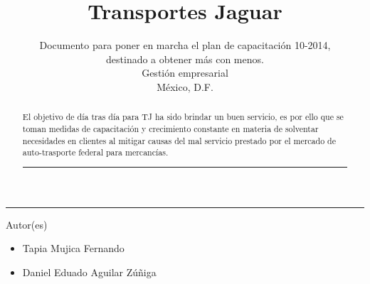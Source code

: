\title{Transportes Jaguar}
\author{Documento para poner en marcha el plan de capacitación 10-2014, \\destinado a obtener más con menos.\\
\small Gestión empresarial\\
\small México, D.F.
}

\vspace{2cm}
\maketitle		
	\vspace*{-1cm}
	\begin{center}\rule{0.9\textwidth}{0.1mm}\end{center}
	\begin{abstract}
	\normalsize El objetivo de día tras día para TJ ha sido brindar un buen servicio, es por ello que se toman medidas de capacitación y crecimiento constante en materia de solventar necesidades en clientes al mitigar causas del mal servicio prestado por el mercado de auto-trasporte federal para mercancías.
	\begin{center}\rule{0.9\textwidth}{0.1mm}\end{center}
	\vspace*{0.5cm}
	\end{abstract}
	\vspace*{9cm}
\small Autor(es)
\begin{itemize}
	\item Tapia Mujica Fernando
	\item  Daniel Eduado Aguilar Zúñiga
\end{itemize}